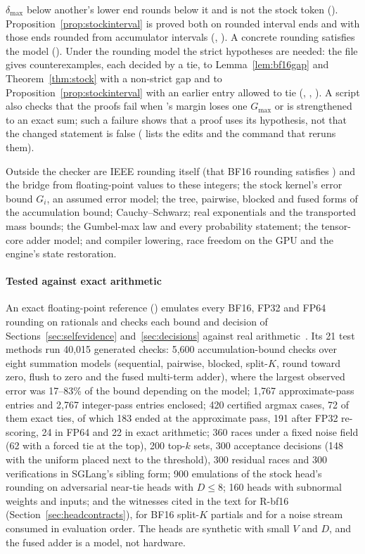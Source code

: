$\delta_{\max}$ below another's lower end rounds below it and is not the stock token (). Proposition~\ref{prop:stockinterval} is proved both on rounded interval ends and with those ends rounded from accumulator intervals (, ). A concrete rounding satisfies the model (). Under the rounding model the strict hypotheses are needed: the file gives counterexamples, each decided by a tie, to Lemma~\ref{lem:bf16gap} and Theorem~\ref{thm:stock} with a non-strict gap and to Proposition~\ref{prop:stockinterval} with an earlier entry allowed to tie (, , ). A script also checks that the proofs fail when 's margin loses one $G_{\max}$ or  is strengthened to an exact sum; such a failure shows that a proof uses its hypothesis, not that the changed statement is false ( lists the edits and the command that reruns them).

Outside the checker are IEEE rounding itself (that BF16 rounding satisfies ) and the bridge from floating-point values to these integers; the stock kernel's error bound $G_i$, an assumed error model; the tree, pairwise, blocked and fused forms of the accumulation bound; Cauchy--Schwarz; real exponentials and the transported mass bounds; the Gumbel-max law and every probability statement; the tensor-core adder model; and compiler lowering, race freedom on the GPU and the engine's state restoration.

\paragraph{Tested against exact arithmetic} An exact floating-point reference () emulates every BF16, FP32 and FP64 rounding on rationals and checks each bound and decision of Sections~\ref{sec:selfevidence} and~\ref{sec:decisions} against real arithmetic~. Its 21 test methods run 40,015 generated checks: 5,600 accumulation-bound checks over eight summation models (sequential, pairwise, blocked, split-$K$, round toward zero, flush to zero and the fused multi-term adder), where the largest observed error was 17--83\% of the bound depending on the model; 1,767 approximate-pass entries and 2,767 integer-pass entries enclosed; 420 certified argmax cases, 72 of them exact ties, of which 183 ended at the approximate pass, 191 after FP32 re-scoring, 24 in FP64 and 22 in exact arithmetic; 360 races under a fixed noise field (62 with a forced tie at the top), 200 top-$k$ sets, 300 acceptance decisions (148 with the uniform placed next to the threshold), 300 residual races and 300 verifications in SGLang's sibling form; 900 emulations of the stock head's rounding on adversarial near-tie heads with $D\le8$; 160 heads with subnormal weights and inputs; and the witnesses cited in the text for R-bf16 (Section~\ref{sec:headcontracts}), for BF16 split-$K$ partials and for a noise stream consumed in evaluation order. The heads are synthetic with small $V$ and $D$, and the fused adder is a model, not hardware.


